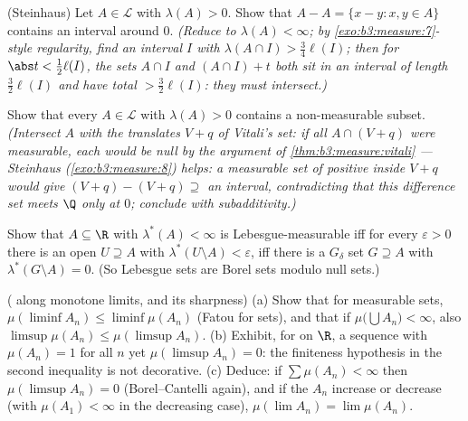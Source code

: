 \begin{exercise}[$\star\star\star$]\label{exo:b3:measure:8}
(Steinhaus) Let $A \in \mathcal L$ with $\lambda(A) > 0$. Show
that $A - A = \{x - y : x, y \in A\}$ contains an interval
around $0$.
\emph{(Reduce to $\lambda(A) < \infty$; by
\cref{exo:b3:measure:7}-style regularity, find an interval $I$
with $\lambda(A \cap I) > \frac34\ell(I)$; then for $\abs t <
\frac12\ell(I)$, the sets $A\cap I$ and $(A\cap I) + t$ both
sit in an interval of length $\frac32\ell(I)$ and have total
 $> \frac32\ell(I)$: they must intersect.)}
\end{exercise}

\begin{exercise}[$\star\star\star$]\label{exo:b3:measure:9}
Show that every $A \in \mathcal L$ with $\lambda(A) > 0$
contains a non-measurable subset. \emph{(Intersect $A$ with the
translates $V + q$ of Vitali's set: if all $A \cap (V+q)$ were
measurable, each would be null by the argument of
\cref{thm:b3:measure:vitali} --- Steinhaus
(\cref{exo:b3:measure:8}) helps: a measurable set of positive
 inside $V + q$ would give $(V+q) - (V+q) \supseteq$
an interval, contradicting that this difference set meets $\Q$
only at $0$; conclude with subadditivity.)}
\end{exercise}

\begin{exercise}[$\star\star$]\label{exo:b3:measure:10}
Show that $A \subseteq \R$ with $\lambda^*(A) < \infty$ is
Lebesgue-measurable iff for every $\varepsilon > 0$ there is an
open $U \supseteq A$ with $\lambda^*(U \setminus A) <
\varepsilon$, iff there is a $G_\delta$ set $G \supseteq A$
with $\lambda^*(G\setminus A) = 0$. (So Lebesgue sets are
Borel sets modulo null sets.)
\end{exercise}

\begin{exercise}[$\star\star$]\label{exo:b3:measure:11}
( along monotone limits, and its sharpness)
(a) Show that for measurable sets, $\mu(\liminf A_n) \leq
\liminf\mu(A_n)$ (Fatou for sets), and that if
$\mu\bigl(\bigcup A_n\bigr) < \infty$, also
$\limsup\mu(A_n) \leq \mu(\limsup A_n)$.
(b) Exhibit, for  on $\R$, a sequence with
$\mu(A_n) = 1$ for all $n$ yet $\mu(\limsup A_n) = 0$: the
finiteness hypothesis in the second inequality is not
decorative.
(c) Deduce: if $\sum\mu(A_n) < \infty$ then
$\mu(\limsup A_n) = 0$ (Borel--Cantelli again), and if the
$A_n$ increase or decrease (with $\mu(A_1) < \infty$ in the
decreasing case), $\mu(\lim A_n) = \lim\mu(A_n)$.
\end{exercise}

